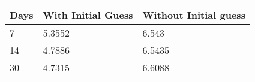 \begin{tabular}{lll}
Days & With Initial Guess & Without Initial guess \\ 
\hline 
7 & 5.3552 & 6.543 \\ 
14 & 4.7886 & 6.5435 \\ 
30 & 4.7315 & 6.6088 \\ 
\hline 
\end{tabular}